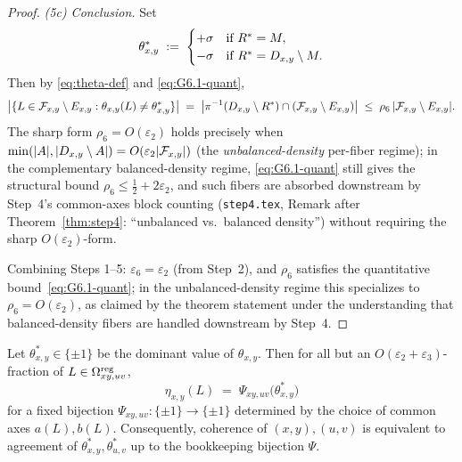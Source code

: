 \begin{proof}
\smallskip
\emph{(5c) Conclusion.} Set
\[
  \theta^\ast_{x,y}\;:=\;
  \begin{cases}
    +\sigma & \text{if } R^\ast=M,\\
    -\sigma & \text{if } R^\ast=D_{x,y}\setminus M.
  \end{cases}
\]
Then by \eqref{eq:theta-def} and \eqref{eq:G6.1-quant},
\[
  \bigl|\{L\in\mathcal{F}_{x,y}\setminus E_{x,y}:\theta_{x,y}(L)\ne\theta^\ast_{x,y}\}\bigr|
  \;=\;
  \bigl|\pi^{-1}(D_{x,y}\setminus R^\ast)\cap(\mathcal{F}_{x,y}\setminus E_{x,y})\bigr|
  \;\le\;\rho_6\,|\mathcal{F}_{x,y}\setminus E_{x,y}|.
\]
The sharp form $\rho_6=O(\varepsilon_2)$ holds precisely when
$\min(|A|,|D_{x,y}\setminus A|)=O(\varepsilon_2|\mathcal{F}_{x,y}|)$ (the
\emph{unbalanced-density} per-fiber regime); in the complementary
balanced-density regime, \eqref{eq:G6.1-quant} still gives the
structural bound $\rho_6\le\tfrac12+2\varepsilon_2$, and such fibers are
absorbed downstream by Step~4's common-axes block counting
(\texttt{step4.tex}, Remark after Theorem~\ref{thm:step4}: ``unbalanced
vs.\ balanced density'') without requiring the sharp
$O(\varepsilon_2)$-form.

\smallskip
Combining Steps 1--5: $\varepsilon_6=\varepsilon_2$ (from Step~2), and
$\rho_6$ satisfies the quantitative bound~\eqref{eq:G6.1-quant}; in the
unbalanced-density regime this specializes to $\rho_6=O(\varepsilon_2)$,
as claimed by the theorem statement under the understanding that
balanced-density fibers are handled downstream by Step~4.
\end{proof}

\begin{lemma}\label{lem:eta-theta}
Let $\theta^\ast_{x,y}\in\{\pm 1\}$ be the dominant value of $\theta_{x,y}$.
Then for all but an $O(\varepsilon_2+\varepsilon_3)$-fraction of
$L\in\Omega^{\mathrm{reg}}_{xy,uv}$,
\[
  \eta_{x,y}(L)\;=\;\Psi_{xy,uv}\bigl(\theta^\ast_{x,y}\bigr)
\]
for a fixed bijection $\Psi_{xy,uv}\colon\{\pm 1\}\to\{\pm 1\}$ determined by the
choice of common axes $a(L),b(L)$. Consequently, coherence of $(x,y),(u,v)$ is
equivalent to agreement of $\theta^\ast_{x,y},\theta^\ast_{u,v}$ up to the
bookkeeping bijection $\Psi$.
\end{lemma}

